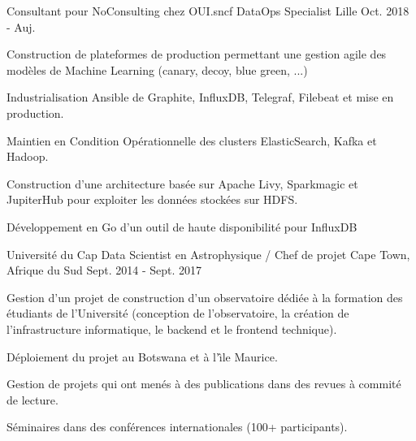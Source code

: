 

\begin{cventries}

  \cventry
    {Consultant pour NoConsulting chez OUI.sncf} %
    {DataOps Specialist} %
    {Lille} %
    {Oct. 2018 - Auj.} %
    {
      \begin{cvitems} %
        \item Construction de plateformes de production permettant une gestion agile des modèles de Machine Learning (canary, decoy, blue green, ...)
        \item  Industrialisation Ansible de Graphite, InfluxDB, Telegraf, Filebeat et mise en production.
        \item  Maintien en Condition Opérationnelle des clusters ElasticSearch, Kafka et Hadoop. 
        \item Construction d'une architecture basée sur Apache Livy, Sparkmagic et JupiterHub pour exploiter les données stockées sur HDFS.
        \item Développement en Go d'un outil de haute disponibilité pour InfluxDB
      \end{cvitems}
    }



  \cventry
    {Université du Cap} %
    {Data Scientist en Astrophysique / Chef de projet} %
    {Cape Town, Afrique du Sud} %
    {Sept. 2014 - Sept. 2017} %
    {
      \begin{cvitems} %
        \item Gestion d'un projet de construction d'un observatoire dédiée à la formation des étudiants de l'Université (conception de l'observatoire, la création de l'infrastructure informatique, le backend et le frontend technique).
        \item Déploiement du projet au Botswana et à l'\^\i le Maurice.
        \item Gestion de projets qui ont menés à des publications dans des revues à commité de lecture.
        \item Séminaires dans des conférences internationales (100+ participants).
      \end{cvitems}
    }


\end{cventries}
